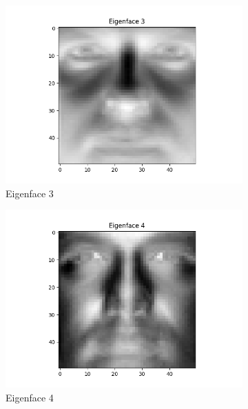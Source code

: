 \documentclass{article}
\begin{document}
\begin{enumerate}[label=(\alph*)]
\begin{figure}[H]
\begin{subfigure}{0.4\textwidth}
            \includegraphics[width=\textwidth]{eigen3.png}
            \caption{Eigenface 3}
        \end{subfigure}
        \begin{subfigure}{0.4\textwidth}
            \includegraphics[width=\textwidth]{eigen4.png}
            \caption{Eigenface 4}
        \end{subfigure}
        \begin{subfigure}{0.4\textwidth}

\end{subfigure}
\end{figure}
\end{enumerate}
\end{document}
